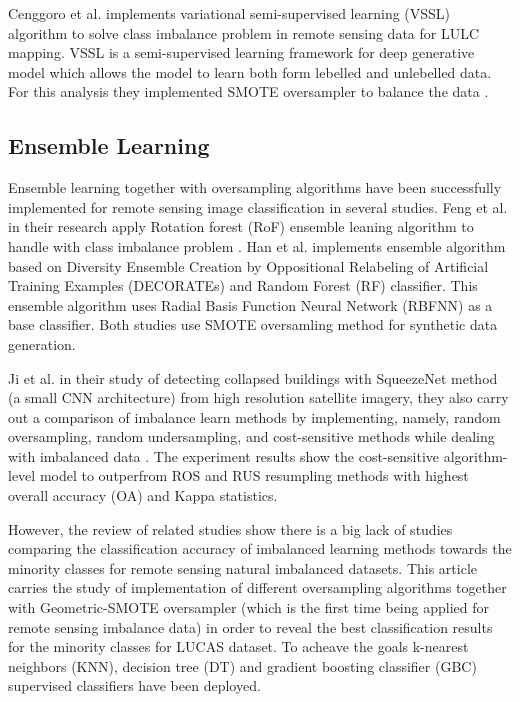 \documentclass[parskip=full]{scrartcl}
\begin{document}
Cenggoro et al. implements variational semi-supervised learning (VSSL) algorithm to solve class imbalance problem in remote sensing data for LULC mapping. VSSL is a semi-supervised learning framework for deep generative model which allows the model to learn both form lebelled and unlebelled data. For this analysis they implemented SMOTE oversampler to balance the data \citep{cenggoro2017classification}. 

\subsection{Ensemble Learning}
Ensemble learning together with oversampling algorithms have been successfully implemented for remote sensing image classification in several studies. Feng et al. in their research apply Rotation forest (RoF) ensemble leaning algorithm to handle with class imbalance problem \citep{feng2019imbalanced}. Han et al. \citep{han2012remote} implements ensemble algorithm based on Diversity Ensemble Creation by Oppositional Relabeling of Artificial Training Examples (DECORATEs) and Random Forest (RF) classifier. This ensemble algorithm uses Radial Basis Function Neural Network (RBFNN) as a base classifier. Both studies use SMOTE oversamling method for synthetic data generation.

Ji et al. in their study of detecting collapsed buildings with SqueezeNet method (a small CNN architecture) from high resolution satellite imagery, they also carry out a comparison of imbalance learn methods by implementing, namely, random oversampling, random undersampling, and cost-sensitive methods while dealing with imbalanced data \citep{ji2018identifying}. The experiment results show the cost-sensitive algorithm-level model to outperfrom ROS and RUS resumpling methods with highest overall accuracy (OA) and Kappa statistics.

However, the review of related studies show there is a big lack of studies comparing the classification accuracy of imbalanced learning methods towards the minority classes for remote sensing natural imbalanced datasets. This article carries the study of implementation of different oversampling algorithms together with Geometric-SMOTE oversampler (which is the first time being applied for remote sensing imbalance data) in order to reveal the best classification results for the minority classes for LUCAS dataset.  To acheave the goals k-nearest neighbors (KNN), decision tree (DT) and gradient boosting classifier (GBC) supervised classifiers have been deployed.





\end{document}
